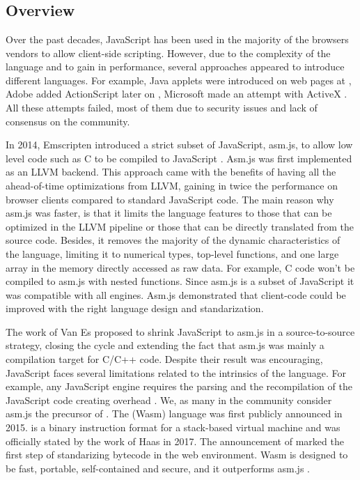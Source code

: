 \section{\wasm}
\label{sota:wasm}


\subsection*{Overview}

Over the past decades, JavaScript has been used in the majority of the browsers vendors to allow client-side scripting. However, due to the complexity of the language and to gain in performance, several approaches appeared to introduce different languages.  For example, Java applets were introduced on web pages at , Adobe added ActionScript later on , Microsoft made an attempt with ActiveX . All these attempts failed, most of them due to security issues and lack of consensus on the community. 

In 2014, Emscripten introduced a strict subset of JavaScript, asm.js, to allow low level code such as C to be compiled to JavaScript . Asm.js was first implemented as an LLVM backend. This approach came with the benefits of having all the ahead-of-time optimizations from LLVM, gaining in twice the performance on browser clients \citationneeded compared to standard JavaScript code. The main reason why asm.js was faster, is that it limits the language features to those that can be optimized in the LLVM pipeline or those that can be directly translated from the source code. Besides, it removes the majority of the dynamic characteristics of the language, limiting it to numerical types, top-level functions, and one large array in the memory directly accessed as raw data. For example, C code won't be compiled to asm.js with nested functions. Since asm.js is a subset of JavaScript it was compatible with all engines. Asm.js demonstrated that client-code could be improved with the right language design and standarization.

The work of Van Es \etal \cite{EsAsm.js} proposed to shrink JavaScript to asm.js in a source-to-source strategy, closing the cycle and extending the fact that asm.js was mainly a compilation target for C/C++ code. Despite their result was encouraging, JavaScript faces several limitations related to the intrinsics of the language. For example, any JavaScript engine requires the parsing and the recompilation of the JavaScript code creating overhead . We, as many in the community consider asm.js the precursor of \wasm. The \wasm (Wasm) language was first publicly announced in 2015. \wasm is a binary instruction format for a stack-based virtual machine and was officially stated by the work of Haas \etal \cite{Haas_2017} in 2017. The announcement of \wasm marked the first step of standarizing bytecode in the web environment. Wasm is designed to be fast, portable, self-contained and secure, and it outperforms asm.js \citationneeded.

